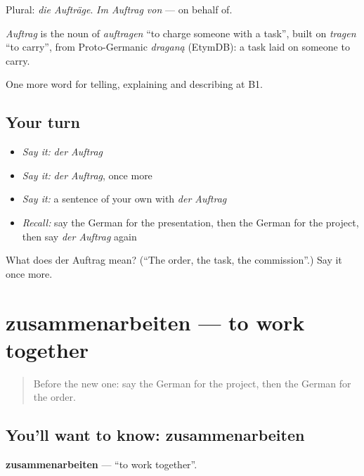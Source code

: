 Plural: \emph{die Aufträge}. \emph{Im Auftrag von} — on behalf of.

\begin{cousinweb}
\emph{Auftrag} is the noun of \emph{auftragen} \textquotedblleft{}to charge someone with a task\textquotedblright{}, built on \emph{tragen} \textquotedblleft{}to carry\textquotedblright{}, from Proto-Germanic \emph{draganą} (EtymDB): a task laid on someone to carry.
\end{cousinweb}

\begin{grammarlens}[title={What you've built}]
One more word for telling, explaining and describing at B1.
\end{grammarlens}

\subsection*{Your turn}
\begin{itemize}
\raggedright
  \item \emph{Say it:} \emph{der Auftrag}
  \item \emph{Say it:} \emph{der Auftrag}, once more
  \item \emph{Say it:} a sentence of your own with \emph{der Auftrag}
  \item \emph{Recall:} say the German for the presentation, then the German for the project, then say \emph{der Auftrag} again
\end{itemize}

\begin{tcolorbox}[breakable,colback=teal!4,colframe=teal!35!black,title={Before you move on}]
What does der Auftrag mean? (\textquotedblleft{}The order, the task, the commission\textquotedblright{}.) Say it once more.
\end{tcolorbox}
\section[zusammenarbeiten]{zusammenarbeiten — to work together}

\label{lesson:GE-C355-zusammenarbeiten}



\begin{quote}
Before the new one: say the German for the project, then the German for the order.
\end{quote}

\subsection*{You'll want to know: zusammenarbeiten}
\textbf{zusammenarbeiten} — \textquotedblleft{}to work together\textquotedblright{}.

